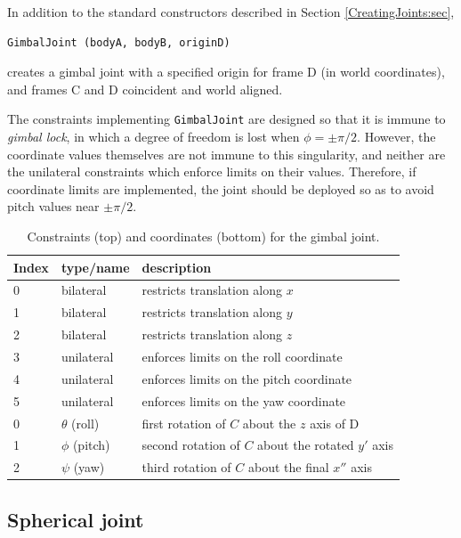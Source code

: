 In addition to the standard constructors described in
Section \ref{CreatingJoints:sec},
\begin{lstlisting}[]
  GimbalJoint (bodyA, bodyB, originD)
\end{lstlisting}
%
creates a gimbal joint with a specified origin for frame D (in world
coordinates), and frames C and D coincident and world aligned.

\begin{sideblock}
The constraints implementing {\tt GimbalJoint} are designed so that it
is immune to {\it gimbal lock}, in which a degree of freedom is lost
when $\phi = \pm \pi/2$. However, the coordinate values themselves are
not immune to this singularity, and neither are the unilateral
constraints which enforce limits on their values. Therefore, if
coordinate limits are implemented, the joint should be deployed so as to
avoid pitch values near $\pm \pi/2$.
\end{sideblock}

\begin{table}[h]
\centering
\begin{tabular}{|l|l|l|}
\hline
Index & type/name & description \\
\hline
0 & bilateral & restricts translation along $x$ \\
1 & bilateral & restricts translation along $y$ \\
2 & bilateral & restricts translation along $z$ \\
3 & unilateral & enforces limits on the roll coordinate \\
4 & unilateral & enforces limits on the pitch coordinate \\
5 & unilateral & enforces limits on the yaw coordinate \\
\hline
\hline
0 & $\theta$ (roll) & first rotation of $C$ about the $z$ axis of D \\
1 & $\phi$ (pitch) & second rotation of $C$ about the rotated $y'$ axis \\
2 & $\psi$ (yaw) & third rotation of $C$ about the final $x''$ axis \\
\hline
\end{tabular}
\caption{Constraints (top) and coordinates (bottom) for the gimbal joint.}
\label{GimbalConstraints:tbl}
\end{table}

\subsection{Spherical joint}

